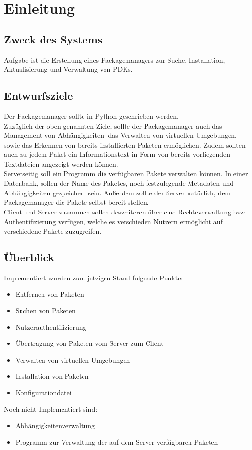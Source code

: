 \chapter{Einleitung}
\section{Zweck des Systems}
Aufgabe ist die Erstellung eines Packagemanagers zur Suche, Installation, Aktualisierung
und Verwaltung von PDKs. 

\section{Entwurfsziele}
Der Packagemanager sollte in Python geschrieben werden.\\

Zuzüglich der oben genannten Ziele, sollte der Packagemanager auch das Management von
Abhängigkeiten, das Verwalten von virtuellen Umgebungen, sowie das Erkennen von bereits
installierten Paketen ermöglichen. Zudem sollten auch zu jedem Paket ein Informationstext
in Form von bereits vorliegenden Textdateien angezeigt werden können.\\


Serverseitig soll ein Programm die verfügbaren Pakete verwalten können. In einer
Datenbank, sollen der Name des Paketes, noch festzulegende Metadaten und
Abhängigkeiten gespeichert sein. Außerdem sollte der Server natürlich, dem
Packagemanager die Pakete selbst bereit stellen. \\

Client und Server zusammen sollen desweiteren über eine Rechteverwaltung bzw.
Authentifizierung verfügen, welche es verschieden Nutzern ermöglicht auf verschiedene
Pakete zuzugreifen.

\clearpage
\section{Überblick}
Implementiert wurden zum jetzigen Stand folgende Punkte:


\begin{itemize}
    \item  Entfernen von Paketen
    \item Suchen von Paketen
    \item Nutzerauthentifizierung
    \item Übertragung von Paketen vom Server zum Client
   \item Verwalten von virtuellen Umgebungen
   \item Installation von Paketen
 \item Konfigurationdatei
\end{itemize}

Noch nicht Implementiert sind:
\begin{itemize}
    \item Abhängigkeitenverwaltung
     \item Programm zur Verwaltung der auf dem Server verfügbaren Paketen
\end{itemize}